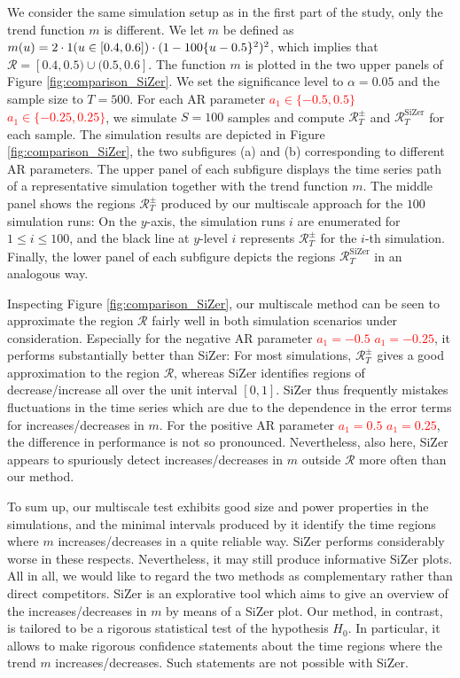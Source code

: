 We consider the same simulation setup as in the first part of the study, only the trend function $m$ is different. We let $m$ be defined as $m(u) = 2 \cdot 1(u \in [0.4,0.6]) \cdot (1 - 100 \{u-0.5\}^2)^2$, which implies that $\mathcal{R} = [0.4,0.5) \cup (0.5,0.6]$. The function $m$ is plotted in the two upper panels of Figure \ref{fig:comparison_SiZer}. We set the significance level to $\alpha= 0.05$ and the sample size to $T=500$. For each AR parameter \textcolor{red}{$a_1 \in \{ -0.5,0.5 \}$ $a_1 \in \{ -0.25,0.25 \}$}, we simulate $S=100$ samples and compute $\mathcal{R}_T^\pm$ and $\mathcal{R}_T^{\text{SiZer}}$ for each sample. The simulation results are depicted in Figure \ref{fig:comparison_SiZer}, the two subfigures (a) and (b) corresponding to different AR parameters. The upper panel of each subfigure displays the time series path of a representative simulation together with the trend function $m$. The middle panel shows the regions $\mathcal{R}_T^\pm$ produced by our multiscale approach for the $100$ simulation runs: On the $y$-axis, the simulation runs $i$ are enumerated for $1 \le i \le 100$, and the black line at $y$-level $i$ represents $\mathcal{R}_T^\pm$ for the $i$-th simulation. Finally, the lower panel of each subfigure depicts the regions $\mathcal{R}_T^{\text{SiZer}}$ in an analogous way. 


Inspecting Figure \ref{fig:comparison_SiZer}, our multiscale method can be seen to approximate the region $\mathcal{R}$ fairly well in both simulation scenarios under consideration. Especially for the negative AR parameter \textcolor{red}{$a_1 = -0.5$ $a_1 = -0.25$}, it performs substantially better than SiZer: For most simulations, $\mathcal{R}_T^\pm$ gives a good approximation to the region $\mathcal{R}$, whereas SiZer identifies regions of decrease/increase all over the unit interval $[0, 1]$. SiZer thus frequently mistakes fluctuations in the time series which are due to the dependence in the error terms for increases/decreases in $m$. For the positive AR parameter \textcolor{red}{$a_1 = 0.5$ $a_1 = 0.25$}, the difference in performance is not so pronounced. Nevertheless, also here, SiZer appears to spuriously detect increases/decreases in $m$ outside $\mathcal{R}$ more often than our method. 


To sum up, our multiscale test exhibits good size and power properties in the simulations, and the minimal intervals produced by it identify the time regions where $m$ increases/decreases in a quite reliable way. SiZer performs considerably worse in these respects. Nevertheless, it may still produce informative SiZer plots. %
All in all, we would like to regard the two methods as complementary rather than direct competitors. SiZer is an explorative tool which aims to give an overview of the increases/decreases in $m$ by means of a SiZer plot. Our method, in contrast, is tailored to be a rigorous statistical test of the hypothesis $H_0$. In particular, it allows to make rigorous confidence statements about the time regions where the trend $m$ increases/decreases. Such statements are not possible with SiZer. 


